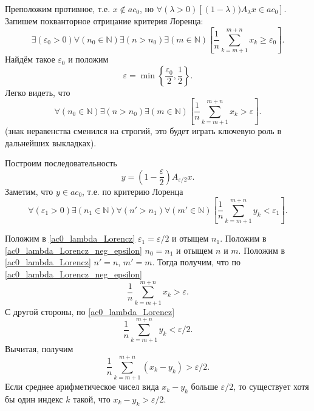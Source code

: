 \documentclass[a4paper,14pt]{article} %
\begin{document}
Преположим противное, т.е. $x\notin ac_0$,
но $\forall(\lambda>0)[(1-\lambda))A_\lambda x \in ac_0]$.
Запишем покванторное отрицание критерия Лоренца:
\begin{equation}\label{ac0_lambda_Lorencz_neg}
	\exists(\varepsilon_0 > 0)
	\forall(n_0 \in \mathbb{N})
	\exists(n > n_0)
	\exists(m \in \mathbb{N})
	\left[
		\frac{1}{n}\sum_{k=m+1}^{m+n} x_k \geq \varepsilon_0
	\right]
	.
\end{equation}
Найдём такое $\varepsilon_0$ и положим
\begin{equation}
	\varepsilon = \min\left\{ \frac{\varepsilon_0}{2}, \frac{1}{2} \right\}
	.
\end{equation}
Легко видеть, что
\begin{equation}\label{ac0_lambda_Lorencz_neg_epsilon}
	\forall(n_0 \in \mathbb{N})
	\exists(n > n_0)
	\exists(m \in \mathbb{N})
	\left[
		\frac{1}{n}\sum_{k=m+1}^{m+n} x_k > \varepsilon
	\right]
	.
\end{equation}
(знак неравенства сменился на строгий, это будет играть ключевую роль в дальнейших выкладках).

Построим последовательность
\begin{equation}
	y = \left( 1 - \frac{\varepsilon}{2} \right) A_{\varepsilon/2} x
	.
\end{equation}
Заметим, что $y\in ac_0$, т.е. по критерию Лоренца
\begin{equation}\label{ac0_lambda_Lorencz}
	\forall(\varepsilon_1 > 0)
	\exists(n_1 \in \mathbb{N})
	\forall(n' > n_1)
	\forall(m' \in \mathbb{N})
	\left[
		\frac{1}{n}\sum_{k=m+1}^{m+n} y_k < \varepsilon_1
	\right]
	.
\end{equation}

Положим в \eqref{ac0_lambda_Lorencz} $\varepsilon_1 = \varepsilon/2$
и отыщем $n_1$.
Положим в \eqref{ac0_lambda_Lorencz_neg_epsilon}
$n_0 = n_1$ и отыщем $n$ и $m$.
Положим в \eqref{ac0_lambda_Lorencz} $n' = n$, $m' = m$.
Тогда получим, что по \eqref{ac0_lambda_Lorencz_neg_epsilon}
\begin{equation}
	\frac{1}{n}\sum_{k=m+1}^{m+n} x_k > \varepsilon
	.
\end{equation}
С другой стороны, по \eqref{ac0_lambda_Lorencz}
\begin{equation}
	\frac{1}{n}\sum_{k=m+1}^{m+n} y_k < \varepsilon/2
	.
\end{equation}
Вычитая, получим
\begin{equation}
	\frac{1}{n}\sum_{k=m+1}^{m+n} (x_k - y_k) > \varepsilon/2
	.
\end{equation}
Если среднее арифметическое чисел вида $x_k - y_k$ больше $\varepsilon/2$,
то существует хотя бы один индекс $k$ такой, что $x_k - y_k > \varepsilon/2$.
\end{document}
